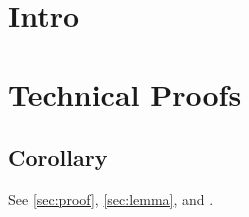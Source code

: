 \section{Intro}
\appendices
\section[Technical Notes]{Technical Proofs}\label{sec:proof}
\subsection{Corollary}\label{sec:lemma}
See \autoref{sec:proof}, \autoref{sec:lemma}, and .
